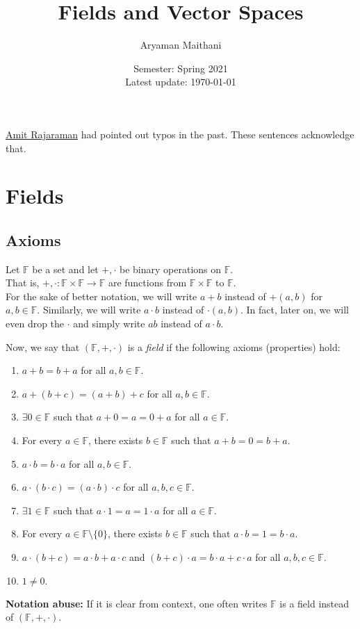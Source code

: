 \documentclass[12pt]{article}
\title{Fields and Vector Spaces}
\author{Aryaman Maithani}%
\date{Semester: Spring 2021\\ Latest update: \today}
\begin{document}
\maketitle

\href{https://bit.ly/RickAstleyOfficial}{Amit Rajaraman} had pointed out typos in the past. These sentences acknowledge that.

\section{Fields}
\subsection{Axioms}

Let $\mathbb{F}$ be a set and let $+, \cdot$ be binary operations on $\mathbb{F}.$\\
That is, $+, \cdot:\mathbb{F}\times\mathbb{F}\to\mathbb{F}$ are functions from $\mathbb{F}\times\mathbb{F}$ to $\mathbb{F}$.\\
For the sake of better notation, we will write $a + b$ instead of $+(a, b)$ for $a, b \in \mathbb{F}.$ Similarly, we will write $a\cdot b$ instead of $\cdot(a, b).$ In fact, later on, we will even drop the $\cdot$ and simply write $ab$ instead of $a\cdot b.$

Now, we say that $(\mathbb{F}, +, \cdot)$ is a \emph{field} if the following axioms (properties) hold:
\begin{enumerate}[label = (A\arabic*)] 
	\item $a + b = b + a$ for all $a, b \in \mathbb{F}.$
	\item $a + (b + c) = (a + b) + c$ for all $a, b \in \mathbb{F}.$
	\item $\exists 0 \in \mathbb{F}$ such that $a + 0 = a = 0 + a$ for all $a \in \mathbb{F}.$
	\item For every $a \in \mathbb{F}$, there exists $b \in \mathbb{F}$ such that $a + b = 0 = b + a.$
	\item $a \cdot b = b \cdot a$ for all $a, b \in \mathbb{F}.$
	\item $a \cdot (b \cdot c) = (a \cdot b) \cdot c$ for all $a, b, c \in \mathbb{F}.$
	\item $\exists 1 \in \mathbb{F}$ such that $a \cdot 1 = a = 1 \cdot a$ for all $a\in \mathbb{F}.$
	\item For every $a \in \mathbb{F}\setminus\{0\}$, there exists $b \in \mathbb{F}$ such that $a \cdot b = 1 = b \cdot a.$
	\item $a\cdot(b + c) = a\cdot b + a\cdot c$ and $(b + c)\cdot a = b\cdot a + c \cdot a$ for all $a, b, c \in \mathbb{F}.$
	\item $1 \neq 0.$

\end{enumerate}
\textbf{Notation abuse:} If it is clear from context, one often writes $\mathbb{F}$ is a field instead of $(\mathbb{F}, +, \cdot).$
\end{document}
